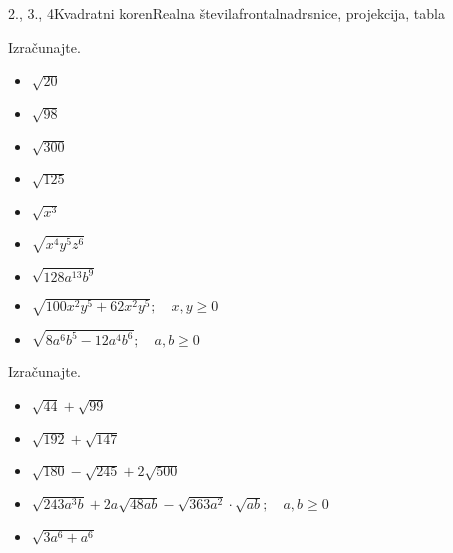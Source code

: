 \begin{priprava}{2., 3., 4}{}{Kvadratni koren}{Realna števila}{frontalna}{drsnice, projekcija, tabla}
\begin{multicols}{2}
            \begin{naloga}
                Izračunajte.
                \begin{itemize}
                        \item $\sqrt{20}$ 
                        \item $\sqrt{98}$ 
                        \item $\sqrt{300}$ 
                        \item $\sqrt{125}$ 
                        \item $\sqrt{x^3}$ 
                        \item $\sqrt{x^4y^5z^6}$ 
                        \item $\sqrt{128a^{13}b^9}$ 
                        \item $\sqrt{100x^2y^5+62x^2y^5}; \quad x,y\geq 0$ 
                        \item $\sqrt{8a^6b^5-12a^4b^6}; \quad a,b\geq 0$ 
                \end{itemize}
            \end{naloga}
        


        
            \begin{naloga}
                Izračunajte.
                \begin{itemize}
                        \item $\sqrt{44}+\sqrt{99}$ 
                        \item $\sqrt{192}+\sqrt{147}$ 
                        \item $\sqrt{180}-\sqrt{245}+2\sqrt{500}$ 
                        \item $\sqrt{243a^3b}+2a\sqrt{48ab}-\sqrt{363a^2}\cdot\sqrt{ab}; \quad a,b\geq 0$ 
                        \item $\sqrt{3a^6+a^6}$ 
                \end{itemize}
            \end{naloga}
        



\end{multicols}
\end{priprava}
